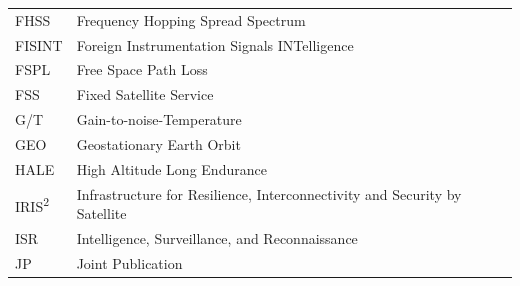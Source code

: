 \documentclass[english, 12pt, a4paper, elec, utf8, a-1b, online]{aaltothesis}
\begin{document}
\begin{tabular}{ll}
FHSS                    & Frequency Hopping Spread Spectrum \\
FISINT                  & Foreign Instrumentation Signals INTelligence \\
FSPL                    & Free Space Path Loss \\
FSS                     & Fixed Satellite Service \\
G/T                     & Gain-to-noise-Temperature \\
GEO                     & Geostationary Earth Orbit \\
HALE                    & High Altitude Long Endurance \\
IRIS\textsuperscript{2} & Infrastructure for Resilience, Interconnectivity and Security by Satellite \\
ISR                     & Intelligence, Surveillance, and Reconnaissance \\
JP                      & Joint Publication \\
\end{tabular}

\pagebreak
\end{document}
